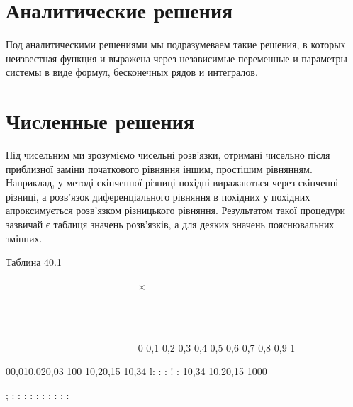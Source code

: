 \documentclass[
  ukrainian,
]{article}
\begin{document}
\section{Аналитические
решения}\label{ux430ux43dux430ux43bux438ux442ux438ux447ux435ux441ux43aux438ux435-ux440ux435ux448ux435ux43dux438ux44f}

Под аналитическими решениями мы подразумеваем такие решения, в которых
неизвестная функция и выражена через независимые переменные и параметры
системы в виде формул, бесконечных рядов и интегралов.

\section{Численные
решения}\label{ux447ux438ux441ux43bux435ux43dux43dux44bux435-ux440ux435ux448ux435ux43dux438ux44f}

Під чисельним ми зрозуміємо чисельні розв'язки, отримані чисельно після
приблизної заміни початкового рівняння іншим, простішим рівнянням.
Наприклад, у методі скінченної різниці похідні виражаються через
скінченні різниці, а розв'язок диференціального рівняння в похідних у
похідних апроксимується розв'язком різницького рівняння. Результатом
такої процедури зазвичай є таблиця значень розв'язків, а для деяких
значень пояснювальних змінних.

Таблина 40.1

~~~~~~~~~~~~~~~~~~~~~~~~~~\textbar{} × \textbar{} \textbar{} \textbar{}
\textbar{} \textbar{} \textbar{} \textbar{} \textbar{} \textbar{}
\textbar{} \textbar{}

\textbar---------------------------\textbar-------------\textbar------------------\textbar-----------\textbar----------\textbar----------\textbar-----\textbar-----\textbar-----\textbar-----------\textbar------------------\textbar------------------\textbar{}

~~~~~~~~~~~~~~~~~~~~~~~~~~\textbar{} 0 \textbar{} 0,1 \textbar{} 0,2
\textbar{} 0,3 \textbar{} 0,4 \textbar{} 0,5 \textbar{} 0,6 \textbar{}
0,7 \textbar{} 0,8 \textbar{} 0,9 \textbar{} 1 \textbar{}

00,010,020,03 \textbar{} 100 \textbar{} 10,20,15 \textbar{} 10,34
\textbar{} l: \textbar{} : \textbar{} : \textbar{} ! \textbar{} :
\textbar{} 10,34 \textbar{} 10,20,15 \textbar{} 1000 \textbar{}

; \textbar{} \textbar{} : \textbar{} : \textbar{} : \textbar{} :
\textbar{} : \textbar{} : \textbar{} : \textbar{} : \textbar{} :
\textbar{} : \textbar{}
\end{document}
